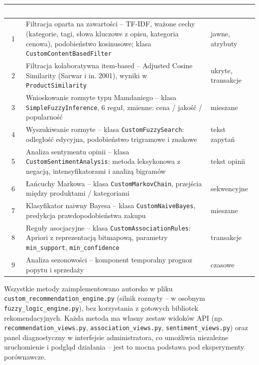 \documentclass[12pt,a4paper]{article}
\begin{document}
\begin{tabularx}{\linewidth}{|c|X|l|}
\hline
\rowcolor{primary}
\textcolor{white}{\textbf{Lp.}} &
\textcolor{white}{\textbf{Metoda i implementacja}} &
\textcolor{white}{\textbf{Dane}} \\ \hline
1 & Filtracja oparta na zawartości -- TF-IDF, ważone cechy (kategorie, tagi, słowa kluczowe z opisu, kategoria cenowa), podobieństwo kosinusowe; klasa \texttt{CustomContentBasedFilter} & jawne, atrybuty \\ \hline
2 & Filtracja kolaboratywna item-based -- Adjusted Cosine Similarity (Sarwar i in. 2001), wyniki w \texttt{ProductSimilarity} & ukryte, transakcje \\ \hline
3 & Wnioskowanie rozmyte typu Mamdaniego -- klasa \texttt{SimpleFuzzyInference}, 6 reguł, zmienne: cena / jakość / popularność & mieszane \\ \hline
4 & Wyszukiwanie rozmyte -- klasa \texttt{CustomFuzzySearch}: odległość edycyjna, podobieństwo trigramowe i znakowe & tekst zapytań \\ \hline
5 & Analiza sentymentu opinii -- klasa \texttt{CustomSentimentAnalysis}: metoda leksykonowa z negacją, intensyfikatorami i analizą bigramów & tekst opinii \\ \hline
6 & Łańcuchy Markowa -- klasa \texttt{CustomMarkovChain}, przejścia między produktami / kategoriami & sekwencyjne \\ \hline
7 & Klasyfikator naiwny Bayesa -- klasa \texttt{CustomNaiveBayes}, predykcja prawdopodobieństwa zakupu & mieszane \\ \hline
8 & Reguły asocjacyjne -- klasa \texttt{CustomAssociationRules}: Apriori z reprezentacją bitmapową, parametry \texttt{min\_support}, \texttt{min\_confidence} & transakcje \\ \hline
9 & Analiza sezonowości -- komponent temporalny prognoz popytu i sprzedaży & czasowe \\ \hline
\end{tabularx}

Wszystkie metody zaimplementowano autorsko w pliku \texttt{custom\_recommendation\_engine.py} (silnik rozmyty -- w osobnym \texttt{fuzzy\_logic\_engine.py}), bez korzystania z gotowych bibliotek rekomendacyjnych. Każda metoda ma własny zestaw widoków API (np. \texttt{recommendation\_views.py}, \texttt{association\_views.py}, \texttt{sentiment\_views.py}) oraz panel diagnostyczny w interfejsie administratora, co umożliwia niezależne uruchomienie i podgląd działania -- jest to mocna podstawa pod eksperymenty porównawcze.
\end{document}
